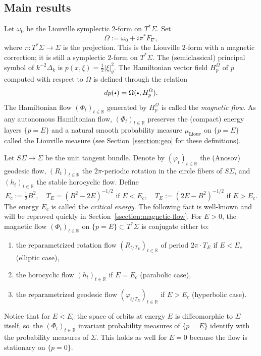\documentclass[10pt]{amsart}
\newcommand{\sbullet}{{\scriptscriptstyle\bullet}}
\newcommand{\csbullet}{{\raisebox{1pt}{$\sbullet$}}}
\theoremstyle{plain}
\theoremstyle{definition}
\newcommand{\R}{\mathbb{R}}
\let\Si\Sigma
\begin{document}
\subsection{Main results}

Let $\omega_0$ be the Liouville symplectic $2$-form on $T^*\Sigma$. Set
\[
\Omega := \omega_0 + i \pi^* F_\nabla,
\]
where $\pi : T^*\Sigma \to \Sigma$ is the projection. This is the Liouville $2$-form with a magnetic correction; it is still a symplectic $2$-form on $T^*\Sigma$. The (semiclassical) principal symbol of $k^{-2}\Delta_k$ is $p(x,\xi) = \tfrac{1}{2}|\xi|^2_g$. The Hamiltonian vector field $H_p^\Omega$ of $p$ computed with respect to $\Omega$ is defined through the relation
\[
dp(\csbullet) = \Omega(\csbullet, H^{\Omega}_p).
\]
The Hamiltonian flow $(\Phi_t)_{t \in \R}$ generated by $H_p^{\Omega}$ is called the \emph{magnetic flow}. As any autonomous Hamiltonian flow, $(\Phi_t)_{t \in \R}$ preserves the (compact) energy layers $\{p=E\}$ and a natural smooth probability measure $\mu_{\mathrm{Liouv}}$ on $\{p=E\}$ called the Liouville measure (see Section~\ref{ssection:geo} for these definitions).

Let $S\Sigma \to \Sigma$ be the unit tangent bundle. Denote by $(\varphi_t)_{t \in \R}$ the (Anosov) geodesic flow, $(R_t)_{t \in \R}$ the $2\pi$-periodic rotation in the circle fibers of $S\Sigma$, and $(h_t)_{t \in \R}$ the stable horocyclic flow. Define
\[
E_c := \tfrac{1}{2}B^2, \quad T_E = (B^2-2E)^{-1/2} \text{ if } E < E_c, \quad T_E := (2E-B^2)^{-1/2} \text{ if } E > E_c.
\]
The energy $E_c$ is called the \emph{critical energy}. The following fact is
well-known \cite{Arnold-61,Ginzburg-96} and will be reproved quickly in
Section~\ref{ssection:magnetic-flow}. For $E > 0$, the magnetic flow $(\Phi_t)_{t \in \R}$ on $\{p=E\}
\subset T^*\Sigma$ is conjugate either to:
\begin{enumerate}

\item the reparametrized rotation flow $(R_{t/T_E})_{t \in \R}$ of period
$2\pi \cdot T_E$ if $E < E_c$ (elliptic case),

\item the horocyclic flow $(h_t)_{t \in \R}$ if $E=E_c$ (parabolic case),

\item the reparametrized geodesic flow $(\varphi_{t/T_E})_{t \in \R}$ if $E>E_c$ (hyperbolic case).
\end{enumerate}
Notice that for $E < E_c$ the space of orbits at energy $E$ is diffeomorphic to $\Si$ itself, so~the $(\Phi_t)_{t \in \R}$ invariant probability measures of $\{ p = E\}$
identify with the probability measures of $\Si$. This holds as well for
$E=0$ because the flow is stationary on $\{ p =0 \}$.
\end{document}
